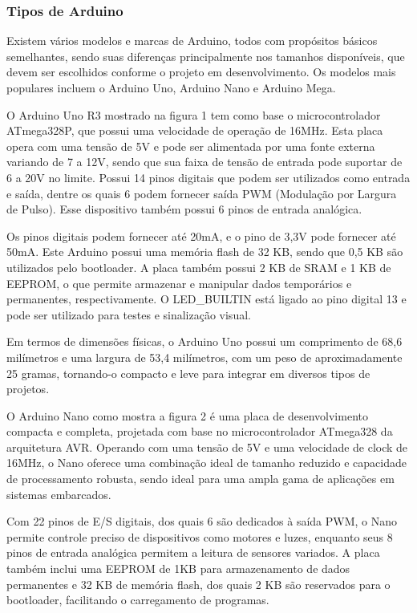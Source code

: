 \subsubsection{Tipos de Arduino}

Existem vários modelos e marcas de Arduino, todos com propósitos básicos semelhantes, sendo suas diferenças principalmente nos tamanhos disponíveis, que devem ser escolhidos conforme o projeto em desenvolvimento. Os modelos mais populares incluem o Arduino Uno, Arduino Nano e Arduino Mega.


O Arduino Uno R3 mostrado na figura 1 tem como base o microcontrolador ATmega328P, que possui uma velocidade de operação de 16MHz. Esta placa opera com uma tensão de 5V e pode ser alimentada por uma fonte externa variando de 7 a 12V, sendo que sua faixa de tensão de entrada pode suportar de 6 a 20V no limite. Possui 14 pinos digitais que podem ser utilizados como entrada e saída, dentre os quais 6 podem fornecer saída PWM (Modulação por Largura de Pulso). Esse dispositivo também possui 6 pinos de entrada analógica.

Os pinos digitais podem fornecer até 20mA, e o pino de 3,3V pode fornecer até 50mA. Este Arduino possui uma memória flash de 32 KB, sendo que 0,5 KB são utilizados pelo bootloader. A placa também possui 2 KB de SRAM e 1 KB de EEPROM, o que permite armazenar e manipular dados temporários e permanentes, respectivamente. O LED\_BUILTIN está ligado ao pino digital 13 e pode ser utilizado para testes e sinalização visual.

Em termos de dimensões físicas, o Arduino Uno possui um comprimento de 68,6 milímetros e uma largura de 53,4 milímetros, com um peso de aproximadamente 25 gramas, tornando-o compacto e leve para integrar em diversos tipos de projetos.


O Arduino Nano como mostra a figura 2 é uma placa de desenvolvimento compacta e completa, projetada com base no microcontrolador ATmega328 da arquitetura AVR. Operando com uma tensão de 5V e uma velocidade de clock de 16MHz, o Nano oferece uma combinação ideal de tamanho reduzido e capacidade de processamento robusta, sendo ideal para uma ampla gama de aplicações em sistemas embarcados.

Com 22 pinos de E/S digitais, dos quais 6 são dedicados à saída PWM, o Nano permite controle preciso de dispositivos como motores e luzes, enquanto seus 8 pinos de entrada analógica permitem a leitura de sensores variados. A placa também inclui uma EEPROM de 1KB para armazenamento de dados permanentes e 32 KB de memória flash, dos quais 2 KB são reservados para o bootloader, facilitando o carregamento de programas.


